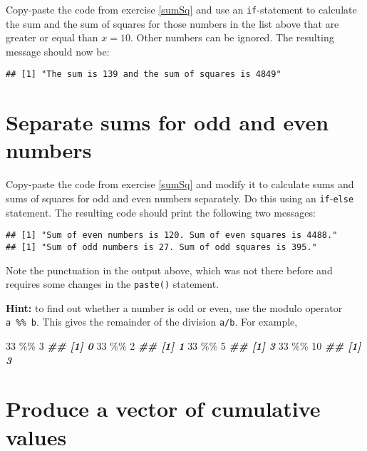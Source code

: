 \documentclass[
]{book}
\newenvironment{Shaded}{\begin{snugshade}}{\end{snugshade}}
\newcommand{\DecValTok}[1]{\textcolor[rgb]{0.00,0.00,0.81}{#1}}
\newcommand{\DocumentationTok}[1]{\textcolor[rgb]{0.56,0.35,0.01}{\textbf{\textit{#1}}}}
\newcommand{\SpecialCharTok}[1]{\textcolor[rgb]{0.00,0.00,0.00}{#1}}
\begin{document}
Copy-paste the code from exercise \ref{sumSq}
and use an \texttt{if}-statement
to calculate the sum and
the sum of squares for those numbers in the list above
that are greater or equal than \(x=10\). Other numbers
can be ignored. The resulting message should now be:

\begin{verbatim}
## [1] "The sum is 139 and the sum of squares is 4849"
\end{verbatim}

\hypertarget{separate-sums-for-odd-and-even-numbers}{%
\section{Separate sums for odd and even numbers}\label{separate-sums-for-odd-and-even-numbers}}

Copy-paste the code from exercise \ref{sumSq}
and modify it to calculate sums and
sums of squares
for odd and even numbers separately.
Do this using an \texttt{if}-\texttt{else}
statement. The resulting code should print
the following two messages:

\begin{verbatim}
## [1] "Sum of even numbers is 120. Sum of even squares is 4488."
## [1] "Sum of odd numbers is 27. Sum of odd squares is 395."
\end{verbatim}

Note the punctuation in the output above, which was
not there before and requires some changes in the \texttt{paste()}
statement.

\textbf{Hint:} to find out whether a number is odd or even,
use the modulo operator \texttt{a\ \%\%\ b}. This gives the remainder of
the division \texttt{a/b}. For example,

\begin{Shaded}
\begin{Highlighting}[]
\DecValTok{33} \SpecialCharTok{\%\%} \DecValTok{3} 
\DocumentationTok{\#\# [1] 0}
\DecValTok{33} \SpecialCharTok{\%\%} \DecValTok{2} 
\DocumentationTok{\#\# [1] 1}
\DecValTok{33} \SpecialCharTok{\%\%} \DecValTok{5} 
\DocumentationTok{\#\# [1] 3}
\DecValTok{33} \SpecialCharTok{\%\%} \DecValTok{10} 
\DocumentationTok{\#\# [1] 3}
\end{Highlighting}
\end{Shaded}

\hypertarget{produce-a-vector-of-cumulative-values}{%
\section{Produce a vector of cumulative values}\label{produce-a-vector-of-cumulative-values}}
\end{document}
